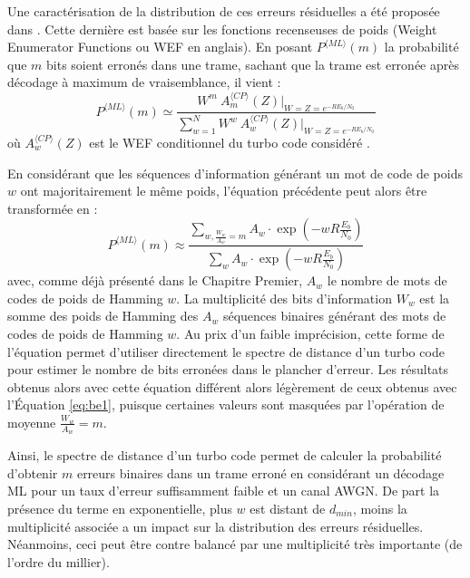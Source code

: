 Une caractérisation de la distribution de ces erreurs 
résiduelles a été proposée dans \cite{residual_errors}. Cette dernière est basée sur les fonctions recenseuses de poids
(Weight Enumerator Functions ou WEF en anglais). En posant $P^{\langle ML\rangle}(m)$ la probabilité que $m$ bits soient 
erronés dans une trame, sachant que la trame est erronée après décodage à maximum de vraisemblance, il vient :
\begin{equation}
P^{\langle ML\rangle}(m) \simeq \frac{W^m~A_m^{\langle CP\rangle}(Z)\vert_{W=Z=e^{-RE_b/N_0}}}{\sum\limits_{w=1}^N W^w~A_w^{\langle CP\rangle}(Z) \vert_{W=Z=e^{-RE_b/N_0}}}
\label{eq:be1}
\end{equation}
où $A_w^{\langle CP\rangle}(Z)$ est le WEF conditionnel du turbo code considéré \cite{benedetto_unveiling}.

En considérant que les séquences d'information 
générant un mot de code de poids $w$ ont majoritairement le même poids, l'équation précédente peut alors être transformée en : 
\begin{equation}
P^{\langle ML\rangle}(m) \approx \frac{\displaystyle\sum\limits_{w, \frac{W_w}{A_w}=m} A_w\cdot \exp\left(-w R \frac{E_b}{N_0}\right)}
                  {\displaystyle\sum\limits_{w} A_w\cdot \exp\left(-w R \frac{E_b}{N_0}\right)}
\label{eq:be2}
\end{equation}
avec, comme déjà présenté dans le Chapitre Premier, $A_w$ le nombre de mots de codes de poids de Hamming $w$. La 
multiplicité des bits d'information $W_w$ est la somme des poids de Hamming des $A_w$ séquences binaires générant des
mots de codes de poids de Hamming $w$. Au prix d'un faible imprécision, cette forme de l'équation permet d'utiliser 
directement le spectre de distance d'un turbo code pour estimer le nombre de bits erronées dans le plancher d'erreur. Les
résultats obtenus alors avec cette équation différent alors légèrement de ceux obtenus avec l'Équation \ref{eq:be1}, puisque 
certaines valeurs sont masquées par l'opération de moyenne $\frac{W_w}{A_w}=m$.

Ainsi, le spectre de distance d'un turbo code permet de calculer la probabilité 
d'obtenir $m$ erreurs binaires dans un trame erroné en considérant un décodage ML pour un taux d'erreur suffisamment 
faible et un canal AWGN. De part la présence du terme en exponentielle, plus $w$ est distant de $d_{min}$, moins la 
multiplicité associée a un impact sur la distribution des erreurs résiduelles. Néanmoins, ceci peut être contre balancé 
par une multiplicité très importante (de l'ordre du millier).

